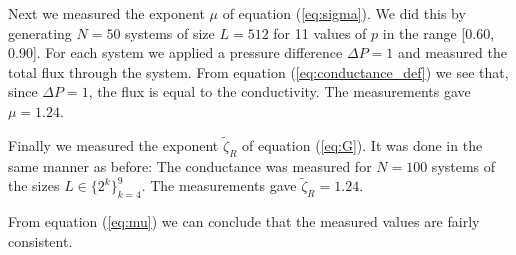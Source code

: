 \documentclass[12pt]{article}
\begin{document}
Next we measured the exponent $\mu$ of equation (\ref{eq:sigma}). We did this by generating $N=50$ systems of size $L=512$ for 11 values of $p$ in the range [0.60, 0.90]. For each system we applied a pressure difference
$\Delta P = 1$ and measured the total flux through the system. From equation (\ref{eq:conductance_def}) we see that, since $\Delta P = 1$, the flux is equal to the conductivity. The measurements gave
$\mu = 1.24$.

Finally we measured the exponent $\tilde\zeta_R$ of equation (\ref{eq:G}). It was done in the same manner as before:
The conductance was measured for $N=100$ systems of the sizes $L\in\{2^k\}_{k=4}^9$. The measurements gave $\tilde\zeta_R = 1.24$.

From equation (\ref{eq:mu}) we can conclude that the measured values are fairly consistent.






\end{document}
